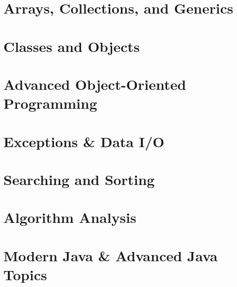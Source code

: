 \chapter{Arrays, Collections, and Generics}
\thispagestyle{chapterstart}
\pagestyle{otherpages}
\label{chapter-arrays-collections}
\setcounter{excounter}{1}
\setcounter{examplecounter}{1}


\chapter{Classes and Objects}
\thispagestyle{chapterstart}
\pagestyle{otherpages}
\label{chapter-classes}
\setcounter{excounter}{1}
\setcounter{examplecounter}{1}


\chapter{Advanced Object-Oriented Programming}
\thispagestyle{chapterstart}
\pagestyle{otherpages}
\label{chapter-advanced-oop}
\setcounter{excounter}{1}
\setcounter{examplecounter}{1}


\chapter{Exceptions \& Data I/O}
\thispagestyle{chapterstart}
\pagestyle{otherpages}
\label{chapter-exceptions-io}
\setcounter{excounter}{1}
\setcounter{examplecounter}{1}


\chapter{Searching and Sorting}
\thispagestyle{chapterstart}
\pagestyle{otherpages}
\label{chapter-searching-sorting}
\setcounter{excounter}{1}
\setcounter{examplecounter}{1}


\chapter{Algorithm Analysis}
\thispagestyle{chapterstart}
\pagestyle{otherpages}
\label{chapter-algorithms}
\setcounter{excounter}{1}
\setcounter{examplecounter}{1}


\chapter{Modern Java \& Advanced Java Topics}
\thispagestyle{chapterstart}
\pagestyle{otherpages}
\label{chapter-modern}
\setcounter{excounter}{1}
\setcounter{examplecounter}{1}


\backmatter
% 

\footnotesize


\nocite{*}
\printindex

